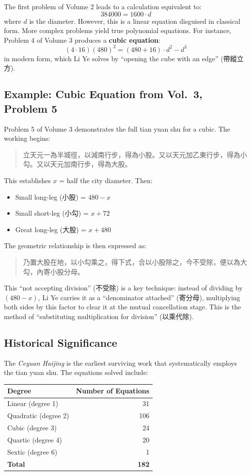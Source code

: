 \documentclass[11pt,a4paper]{article}
\begin{document}
The first problem of Volume 2 leads to a calculation equivalent to:
\[
384000 = 1600 \cdot d
\]
where $d$ is the diameter. However, this is a linear equation disguised in classical form. More complex problems yield true polynomial equations. For instance, Problem 4 of Volume 3 produces a \textbf{cubic equation}:
\[
(4 \cdot 16)(480)^2 = (480 + 16) \cdot d^2 - d^3
\]
in modern form, which Li Ye solves by ``opening the cube with an edge'' (帶縱立方).

\subsection{Example: Cubic Equation from Vol.\ 3, Problem 5}

Problem 5 of Volume 3 demonstrates the full tian yuan shu for a cubic. The working begins:

\begin{quote}
立天元一為半城徑，以減南行步，得為小股。又以天元加乙東行步，得為小勾。又以天元加南行步，得為大股。
\end{quote}

This establishes $x$ = half the city diameter. Then:
\begin{itemize}
  \item Small long-leg (小股) = $480 - x$
  \item Small short-leg (小勾) = $x + 72$
  \item Great long-leg (大股) = $x + 480$
\end{itemize}

The geometric relationship is then expressed as:
\begin{quote}
乃置大股在地，以小勾乘之，得下式，合以小股除之，今不受除，便以為大勾，內寄小股分母。
\end{quote}

This ``not accepting division'' (不受除) is a key technique: instead of dividing by $(480-x)$, Li Ye carries it as a ``denominator attached'' (寄分母), multiplying both sides by this factor to clear it at the mutual cancellation stage. This is the method of ``substituting multiplication for division'' (以乘代除).

\subsection{Historical Significance}

The \textit{Ceyuan Haijing} is the earliest surviving work that systematically employs the tian yuan shu. The equations solved include:
\begin{center}
\begin{tabular}{lr}
\toprule
\textbf{Degree} & \textbf{Number of Equations} \\
\midrule
Linear (degree 1) & 31 \\
Quadratic (degree 2) & 106 \\
Cubic (degree 3) & 24 \\
Quartic (degree 4) & 20 \\
Sextic (degree 6) & 1 \\
\midrule
\textbf{Total} & \textbf{182} \\
\bottomrule
\end{tabular}
\end{center}
\end{document}

